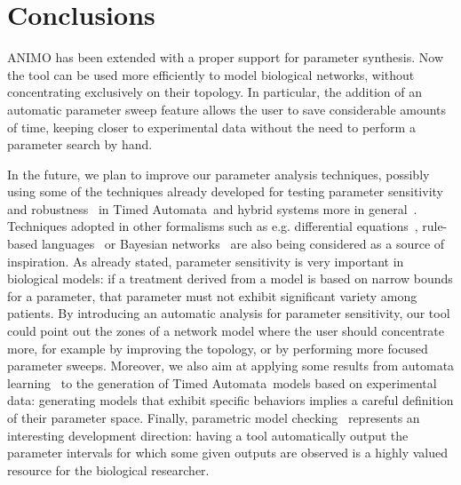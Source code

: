 \documentclass[submission,copyright,creativecommons]{eptcs}
\def\tas{Timed Automata}
\begin{document}
\section{Conclusions}
ANIMO has been extended with a proper support for parameter synthesis. Now the tool can be used more efficiently
to model biological networks, without concentrating exclusively on their topology.
In particular, the addition of an automatic parameter sweep feature allows the user
to save considerable amounts of time, keeping closer to experimental data without the need
to perform a parameter search by hand.

In the future, we plan to improve our parameter analysis techniques, possibly using some of
the techniques already developed for testing parameter sensitivity~\cite{inverse-ta1, inverse-ta2} and
robustness~\cite{robust-ta1, robust-ta2, robust-ta3, robust-ta4} in \tas\ and hybrid systems more in general~\cite{decidability-ta-ha, imitator2}.
Techniques adopted in other formalisms such as e.g. differential equations~\cite{copasi, breach, kinfer}, rule-based languages~\cite{biocham, rulebender}
or Bayesian networks~\cite{bayes-infer} are also being
considered as a source of inspiration.
As already stated, parameter sensitivity is very important in biological models: if a treatment
derived from a model is based on narrow bounds for a parameter, that parameter must not exhibit significant
variety among patients. By introducing an automatic analysis for parameter sensitivity, our tool
could point out the zones of a network model where the user should concentrate more, for example by
improving the topology, or by performing more focused parameter sweeps.
Moreover, we also aim at applying some results from automata learning~\cite{test-based-modelling} to the generation of
\tas\ models based on experimental data: generating models that exhibit specific behaviors
implies a careful definition of their parameter space.
Finally, parametric model checking~\cite{param-mc} represents an interesting development direction:
having a tool automatically output the parameter intervals for which some
given outputs are observed is a highly valued resource for the biological researcher.
\end{document}

